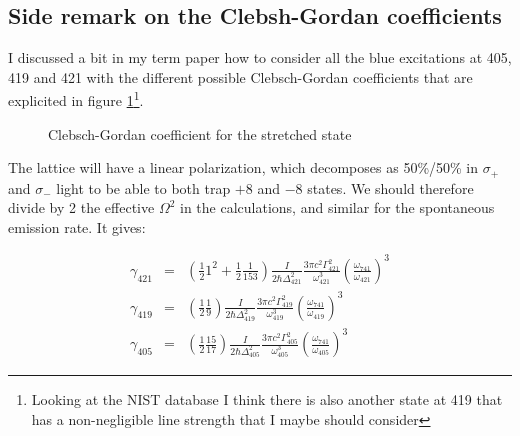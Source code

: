 \documentclass[reprint,amsmath,amssymb,aps,nofootinbib]{revtex4-1}
\begin{document}
\subsection{Side remark on the Clebsh-Gordan coefficients}

I discussed a bit in my term paper how to consider all the blue excitations at 405, 419 and 421 with the different possible Clebsch-Gordan coefficients that are explicited in figure \ref{fig:CCC}\footnote{Looking at the NIST database I think there is also another state at 419 that has a non-negligible line strength that I maybe should consider}.

\begin{figure}
\begin{center}
\caption{\label{fig:CCC}Clebsch-Gordan coefficient for the stretched state}
\end{center}
\end{figure}

The lattice will have a linear polarization, which decomposes as 50\%/50\% in $\sigma_{+}$ and $\sigma_{-}$ light to be able to both trap $+8$ and $-8$ states. We should therefore divide by 2 the effective $\Omega^{2}$ in the calculations, and similar for the spontaneous emission rate. It gives:

\begin{equation}
\begin{array}{lllll}
\gamma_{421} &=& \left(\frac{1}{2}1^{2}+\frac{1}{2}\frac{1}{153}\right)\frac{I}{2\hbar\Delta_{421}^{2}}\frac{3\pi c^{2}\Gamma_{421}^{2}}{\omega_{421}^{3}}\left(\frac{\omega_{741}}{\omega_{421}}\right)^{3} \\
\gamma_{419} &=& \left(\frac{1}{2}\frac{1}{9}\right)\frac{I}{2\hbar\Delta_{419}^{2}}\frac{3\pi c^{2}\Gamma_{419}^{2}}{\omega_{419}^{3}}\left(\frac{\omega_{741}}{\omega_{419}}\right)^{3} \\
\gamma_{405} &=& \left(\frac{1}{2}\frac{15}{17}\right)\frac{I}{2\hbar\Delta_{405}^{2}}\frac{3\pi c^{2}\Gamma_{405}^{2}}{\omega_{405}^{3}}\left(\frac{\omega_{741}}{\omega_{405}}\right)^{3}
\end{array}
\end{equation}
\end{document}
